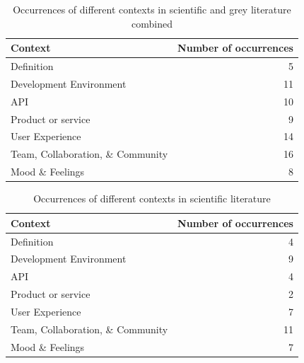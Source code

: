 \documentclass[english, 12pt, a4paper, sci, utf8, a-1b, online]{aaltothesis}
\begin{document}
\begin{table}[ht]
  \begin{center}
    \begin{tabular}{l r}
      Context                           & Number of occurrences \\
      \hline
      Definition                        & 5                     \\
      Development Environment           & 11                    \\
      API                               & 10                    \\
      Product or service                & 9                     \\
      User Experience                   & 14                    \\
      Team, Collaboration, \& Community & 16                    \\
      Mood \& Feelings                  & 8                     \\
      \hline
    \end{tabular}
    \caption{Occurrences of different contexts in scientific and grey literature combined}
  \end{center}
\end{table}

\begin{table}[ht]
  \begin{center}
    \begin{tabular}{l r}
      Context                           & Number of occurrences \\
      \hline
      Definition                        & 4                     \\
      Development Environment           & 9                     \\
      API                               & 4                     \\
      Product or service                & 2                     \\
      User Experience                   & 7                     \\
      Team, Collaboration, \& Community & 11                    \\
      Mood \& Feelings                  & 7                     \\
      \hline
    \end{tabular}
    \caption{Occurrences of different contexts in scientific literature}
  \end{center}
\end{table}
\end{document}
